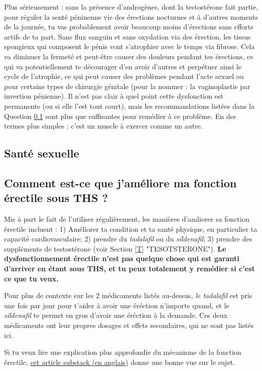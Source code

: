 \documentclass{article}
\begin{document}
Plus sérieusement : sans la présence d'androgènes, dont la testostérone fait partie, pour réguler la senté péninenne vie des érections nocturnes et à d'autres moments de la journée, tu vas probablement avoir beaucoup moins d'érections sans efforts actifs de ta part. Sans flux sanguin et sans oxydation via des érection, les tissus spongieux qui composent le pénis vont s'atrophier avec le temps via fibrose. Cela va diminuer la fermeté et peut-être causer des douleurs pendant tes érections, ce qui va potentiellement te décourager d'en avoir d'autres et perpétuer ainsi le cycle de l'atrophie, ce qui peut causer des problèmes pendant l'acte sexuel ou pour certains types de chirurgie génitale (pour la nommer : la vaginoplastie par invertion pénienne). Il n'est pas clair à quel point cette dysfonction est permanente (ou si elle l'est tout court), mais les recommandations listées dans la Question \ref{11-20} sont plus que suffisantes pour remédier à ce problème. En des termes plus simples : c'est un muscle à exercer comme un autre.

\subsection*{Santé sexuelle}

\subsection{Comment est-ce que j'améliore ma fonction érectile sous THS ?}\label{11-20}

Mis à part le fait de l'utiliser régulièrement, les manières d'amliorer sa fonction érectile incluent : 1) Améliorer ta condition et ta santé physique, en particulier ta capacité cardiovasculaire; 2) prendre du \textit{tadalafil} ou du \textit{sildenafil}; 3) prendre des suppléments de testostérone (voir Section \ref{T} "TESOTSTERONE"). \textbf{Le dysfonctionnement érectile n'est pas quelque chose qui est garanti d'arriver en étant sous THS, et tu peux totalement y remédier si c'est ce que tu veux.} 

Pour plus de contexte sur les 2 médicaments listés au-dessus, \textit{le tadalafil} est pris une fois par jour pour t'aider à avoir une éréction n'importe quand, et le \textit{sildenafil} te permet en gros d'avoir une éréction à la demande. Ces deux médicaments ont leur propres dosages et effets secondaires, qui ne sont pas listés ici.  

Si tu veux lire une explication plus approfondie du mécanisme de la fonction érectile, \href{https://stainedglasswoman.substack.com/p/how-to-maintain-your-penis-function}{cet article substack (en anglais)} donne une bonne vue sur le sujet.
\end{document}
